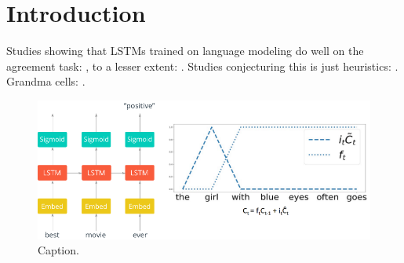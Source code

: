 \section{Introduction}
\lipsum[1-6]

Studies showing that LSTMs trained on language modeling do well on the
agreement task: \cite{Gulordava:etal:2018,Kuncoro:etal:2018a}, to a
lesser extent: \cite{Bernardy:Lappin:2017,Linzen:etal:2016}. Studies
conjecturing this is just heuristics:
\cite{Kuncoro:etal:2018b,Linzen:Leonard:2018}. Grandma cells: \cite{Bowers:2009}.

\begin{figure}
\includegraphics[width=\linewidth]{Figures/Figure1_intro.png}
\caption{Caption.}
\end{figure}
